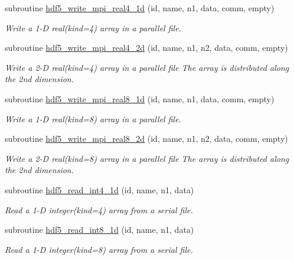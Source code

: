 \begin{DoxyCompactItemize}
subroutine \hyperlink{classmodhdf5_aa5b200799b385418068f6c916bbbad34}{hdf5\-\_\-write\-\_\-mpi\-\_\-real4\-\_\-1d} (id, name, n1, data, comm, empty)
\begin{DoxyCompactList}\small\item\em Write a 1-\/\-D real(kind=4) array in a parallel file. \end{DoxyCompactList}\item 
subroutine \hyperlink{classmodhdf5_a6c880adf75b8b8a5ad56120effed2f6a}{hdf5\-\_\-write\-\_\-mpi\-\_\-real4\-\_\-2d} (id, name, n1, n2, data, comm, empty)
\begin{DoxyCompactList}\small\item\em Write a 2-\/\-D real(kind=4) array in a parallel file The array is distributed along the 2nd dimension. \end{DoxyCompactList}\item 
subroutine \hyperlink{classmodhdf5_a6fe25705d9c64cf43c06c885a71878e2}{hdf5\-\_\-write\-\_\-mpi\-\_\-real8\-\_\-1d} (id, name, n1, data, comm, empty)
\begin{DoxyCompactList}\small\item\em Write a 1-\/\-D real(kind=8) array in a parallel file. \end{DoxyCompactList}\item 
subroutine \hyperlink{classmodhdf5_a670313739a46ec4d9006d8761d35157a}{hdf5\-\_\-write\-\_\-mpi\-\_\-real8\-\_\-2d} (id, name, n1, n2, data, comm, empty)
\begin{DoxyCompactList}\small\item\em Write a 2-\/\-D real(kind=8) array in a parallel file The array is distributed along the 2nd dimension. \end{DoxyCompactList}\item 
subroutine \hyperlink{classmodhdf5_afda2e44922def0d140ce850c12ef2f48}{hdf5\-\_\-read\-\_\-int4\-\_\-1d} (id, name, n1, data)
\begin{DoxyCompactList}\small\item\em Read a 1-\/\-D integer(kind=4) array from a serial file. \end{DoxyCompactList}\item 
subroutine \hyperlink{classmodhdf5_a640df6ccea7f28d6ed6b578d8018d7d7}{hdf5\-\_\-read\-\_\-int8\-\_\-1d} (id, name, n1, data)
\begin{DoxyCompactList}\small\item\em Read a 1-\/\-D integer(kind=8) array from a serial file. \end{DoxyCompactList}\item 

\end{DoxyCompactItemize}
